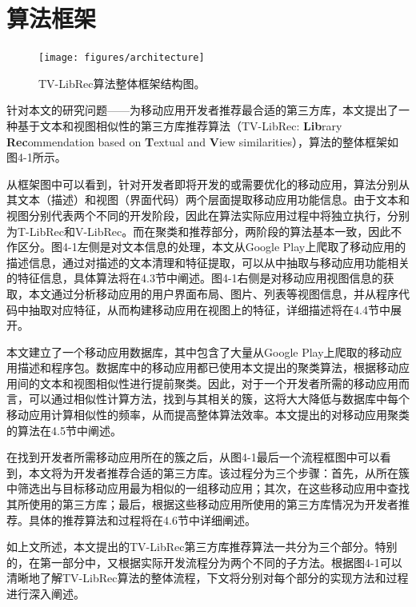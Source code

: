 \section{算法框架}
\begin{figure}
	\centering
	\texttt{[image: figures/architecture]}
	\caption{TV-LibRec算法整体框架结构图。}
\end{figure}

针对本文的研究问题——为移动应用开发者推荐最合适的第三方库，本文提出了一种基于文本和视图相似性的第三方库推荐算法（TV-LibRec: \textbf{Lib}rary \textbf{Rec}ommendation based on \textbf{T}extual and \textbf{V}iew similarities），算法的整体框架如图4-1所示。

从框架图中可以看到，针对开发者即将开发的或需要优化的移动应用，算法分别从其文本（描述）和视图（界面代码）两个层面提取移动应用功能信息。由于文本和视图分别代表两个不同的开发阶段，因此在算法实际应用过程中将独立执行，分别为T-LibRec和V-LibRec。而在聚类和推荐部分，两阶段的算法基本一致，因此不作区分。图4-1左侧是对文本信息的处理，本文从Google Play上爬取了移动应用的描述信息，通过对描述的文本清理和特征提取，可以从中抽取与移动应用功能相关的特征信息，具体算法将在4.3节中阐述。图4-1右侧是对移动应用视图信息的获取，本文通过分析移动应用的用户界面布局、图片、列表等视图信息，并从程序代码中抽取对应特征，从而构建移动应用在视图上的特征，详细描述将在4.4节中展开。

本文建立了一个移动应用数据库，其中包含了大量从Google Play上爬取的移动应用描述和程序包。数据库中的移动应用都已使用本文提出的聚类算法，根据移动应用间的文本和视图相似性进行提前聚类。因此，对于一个开发者所需的移动应用而言，可以通过相似性计算方法，找到与其相关的簇，这将大大降低与数据库中每个移动应用计算相似性的频率，从而提高整体算法效率。本文提出的对移动应用聚类的算法在4.5节中阐述。

在找到开发者所需移动应用所在的簇之后，从图4-1最后一个流程框图中可以看到，本文将为开发者推荐合适的第三方库。该过程分为三个步骤：首先，从所在簇中筛选出与目标移动应用最为相似的一组移动应用；其次，在这些移动应用中查找其所使用的第三方库；最后，根据这些移动应用所使用的第三方库情况为开发者推荐。具体的推荐算法和过程将在4.6节中详细阐述。

如上文所述，本文提出的TV-LibRec第三方库推荐算法一共分为三个部分。特别的，在第一部分中，又根据实际开发流程分为两个不同的子方法。根据图4-1可以清晰地了解TV-LibRec算法的整体流程，下文将分别对每个部分的实现方法和过程进行深入阐述。



